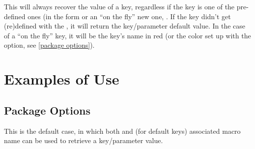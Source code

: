 \documentclass[10pt]{article}
\begin{document}
\begin{codedescribe}{\QuestVal}
\begin{codesyntax}%
\end{codesyntax}
This will always recover the value of a key, regardless if the key is one of the pre-defined ones (in the form  or an ``on the fly'' new one, .
If the key didn't get (re)defined with the , it will return the key/parameter default value. In the case of a ``on the fly'' key, it will be the key's name in red (or the color set up with the  option, see \ref{package options}).

\end{codedescribe}

\section{Examples of Use}



\subsection{Package Options}
\begin{codestore}
\usepackage{tikzquests}
\end{codestore}

This is the default case, in which both \tsobj{\QuestVal} and (for default keys) associated macro name can be used to retrieve a key/parameter value.
\end{document}
